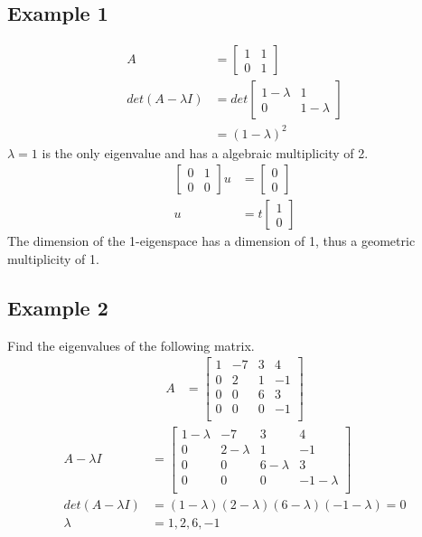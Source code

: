 \documentclass{article}
\theoremstyle{mytheoremstyle}
\theoremstyle{mytheoremstyle}
\theoremstyle{myproblemstyle}
\begin{document}
    \subsection*{Example 1}
    \begin{align*}
        A &= \begin{bmatrix}
            1 & 1 \\
            0 & 1
        \end{bmatrix} \\
        det(A-\lambda I) &= det\begin{bmatrix}
            1-\lambda & 1 \\
            0 & 1-\lambda
        \end{bmatrix} \\
        &= (1-\lambda)^2
    \end{align*}
    $\lambda=1$ is the only eigenvalue and has a algebraic multiplicity of 2.
    \begin{align*}
        \begin{bmatrix}
            0 & 1 \\
            0 & 0
        \end{bmatrix}u &= \begin{bmatrix}
            0 \\ 0
        \end{bmatrix} \\
        u &= t \begin{bmatrix}
            1 \\ 0
        \end{bmatrix}
    \end{align*}
    The dimension of the 1-eigenspace has a dimension of 1, thus a geometric
    multiplicity of 1.

    \subsection*{Example 2}
    Find the eigenvalues of the following matrix.
    \begin{align*}
        A &= \begin{bmatrix}
            1 & -7 & 3 & 4 \\
            0 & 2 & 1 & -1 \\
            0 & 0 & 6 & 3 \\
            0 & 0 & 0 & -1 \\
        \end{bmatrix}
    \end{align*}
    \begin{align*}
        A-\lambda I &= \begin{bmatrix}
            1-\lambda & -7 & 3 & 4 \\
            0 & 2-\lambda & 1 & -1 \\
            0 & 0 & 6-\lambda & 3 \\
            0 & 0 & 0 & -1-\lambda \\
        \end{bmatrix} \\
        det(A-\lambda I) &= (1-\lambda)(2-\lambda)(6-\lambda)(-1-\lambda) = 0 \\
        \lambda &= 1,2,6,-1
    \end{align*}
\end{document}
